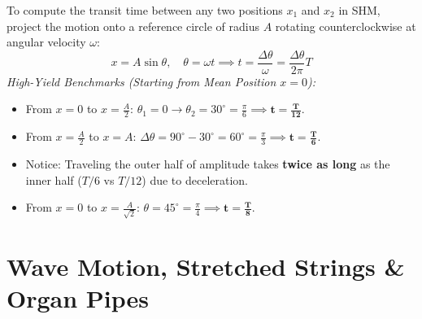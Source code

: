 \documentclass[10pt,twoside,openright]{book}
\begin{document}
\begin{usecasebox}
To compute the transit time between any two positions $x_1$ and $x_2$ in SHM, project the motion onto a reference circle of radius $A$ rotating counterclockwise at angular velocity $\omega$:
\begin{equation}
  x = A \sin\theta, \quad \theta = \omega t \implies t = \frac{\Delta\theta}{\omega} = \frac{\Delta\theta}{2\pi} T
\end{equation}
\textit{High-Yield Benchmarks (Starting from Mean Position $x=0$):}
\begin{itemize}
  \item From $x = 0$ to $x = \frac{A}{2}$: $\theta_1 = 0 \to \theta_2 = 30^\circ = \frac{\pi}{6} \implies \mathbf{t = \frac{T}{12}}$.
  \item From $x = \frac{A}{2}$ to $x = A$: $\Delta\theta = 90^\circ - 30^\circ = 60^\circ = \frac{\pi}{3} \implies \mathbf{t = \frac{T}{6}}$.
  \item Notice: Traveling the outer half of amplitude takes \textbf{twice as long} as the inner half ($T/6$ vs $T/12$) due to deceleration.
  \item From $x = 0$ to $x = \frac{A}{\sqrt{2}}$: $\theta = 45^\circ = \frac{\pi}{4} \implies \mathbf{t = \frac{T}{8}}$.
\end{itemize}
\end{usecasebox}

\section{Wave Motion, Stretched Strings \& Organ Pipes}
\end{document}

